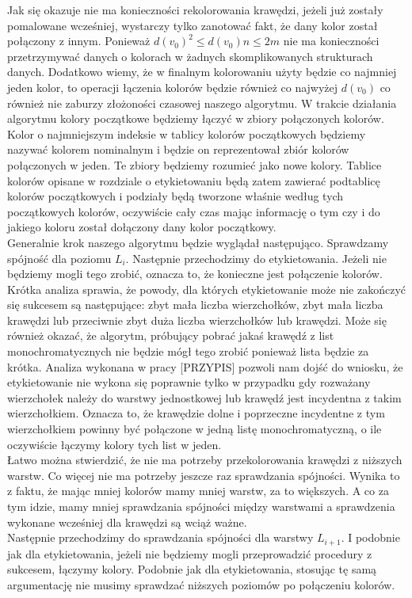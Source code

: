\documentclass[12pt,a4paper,titlepage]{article}
\begin{document}
Jak się okazuje nie ma konieczności rekolorowania krawędzi, jeżeli już zostały pomalowane wcześniej, wystarczy tylko zanotować fakt, że dany kolor został połączony z innym. Ponieważ $d(v_0)^2 \leqslant d(v_0)n \leqslant 2m $ nie ma konieczności przetrzymywać danych o kolorach w żadnych skomplikowanych strukturach danych. Dodatkowo wiemy, że w finalnym kolorowaniu użyty będzie co najmniej jeden kolor, to operacji łączenia kolorów będzie również co najwyżej $d(v_0)$ co również nie zaburzy złożoności czasowej naszego algorytmu. W trakcie działania algorytmu kolory początkowe będziemy łączyć w zbiory połączonych kolorów. Kolor o najmniejszym indeksie w tablicy kolorów początkowych będziemy nazywać kolorem nominalnym i będzie on reprezentował zbiór kolorów połączonych w jeden. Te zbiory będziemy rozumieć jako nowe kolory. Tablice kolorów opisane w rozdziale o etykietowaniu będą zatem zawierać podtablicę kolorów początkowych i podziały będą tworzone właśnie według tych początkowych kolorów, oczywiście cały czas mając informację o tym czy i do jakiego koloru został dołączony dany kolor początkowy.\\
Generalnie krok naszego algorytmu będzie wyglądał następująco. Sprawdzamy spójność dla poziomu $L_i$. Następnie przechodzimy do etykietowania. Jeżeli nie będziemy mogli tego zrobić, oznacza to, że konieczne jest połączenie kolorów. Krótka analiza sprawia, że powody, dla których etykietowanie może nie zakończyć się sukcesem są następujące: zbyt mała liczba wierzchołków, zbyt mała liczba krawędzi lub przeciwnie zbyt duża liczba wierzchołków lub krawędzi. Może się również okazać, że algorytm, próbujący pobrać jakaś krawędź z list monochromatycznych nie będzie mógł tego zrobić ponieważ lista będzie za krótka. Analiza wykonana w pracy [PRZYPIS] pozwoli nam dojść do wniosku, że etykietowanie nie wykona się poprawnie tylko w przypadku gdy rozważany wierzchołek należy do warstwy jednostkowej lub krawędź jest incydentna z takim wierzchołkiem. Oznacza to, że krawędzie dolne i poprzeczne incydentne z tym wierzchołkiem powinny być połączone w jedną listę monochromatyczną, o ile oczywiście łączymy kolory tych list w jeden. \\
Łatwo można stwierdzić, że nie ma potrzeby przekolorowania krawędzi z niższych warstw. Co więcej nie ma potrzeby jeszcze raz sprawdzania spójności. Wynika to z faktu, że mając mniej kolorów mamy mniej warstw, za to większych. A co za tym idzie, mamy mniej sprawdzania spójności między warstwami a sprawdzenia wykonane wcześniej dla krawędzi są wciąż ważne. \\
Następnie przechodzimy do sprawdzania spójności dla warstwy $L_{i+1}$. I podobnie jak dla etykietowania, jeżeli nie będziemy mogli przeprowadzić procedury z sukcesem, łączymy kolory. Podobnie jak dla etykietowania, stosując tę samą argumentację nie musimy sprawdzać niższych poziomów po połączeniu kolorów.\\ 
\end{document}
